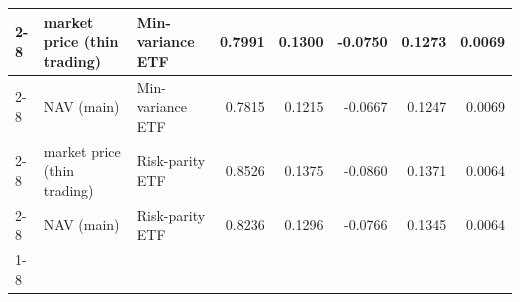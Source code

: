 \begin{table}
\begin{tabular}{lllrrrrr}
\cline{2-8}
 & market price (thin trading) & Min-variance ETF & 0.7991 & 0.1300 & -0.0750 & 0.1273 & 0.0069 \\
\cline{2-8}
 & NAV (main) & Min-variance ETF & 0.7815 & 0.1215 & -0.0667 & 0.1247 & 0.0069 \\
\cline{2-8}
 & market price (thin trading) & Risk-parity ETF & 0.8526 & 0.1375 & -0.0860 & 0.1371 & 0.0064 \\
\cline{2-8}
 & NAV (main) & Risk-parity ETF & 0.8236 & 0.1296 & -0.0766 & 0.1345 & 0.0064 \\
\cline{1-8} \cline{2-8}
\bottomrule
\end{tabular}
\end{table}
